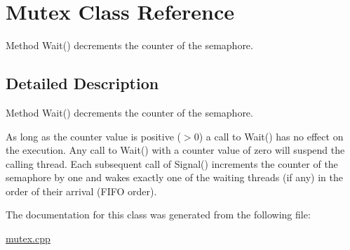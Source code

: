\hypertarget{class_mutex}{}\section{Mutex Class Reference}
\label{class_mutex}


Method Wait() decrements the counter of the semaphore.  




\subsection{Detailed Description}
Method Wait() decrements the counter of the semaphore. 

As long as the counter value is positive ($>$0) a call to Wait() has no effect on the execution. Any call to Wait() with a counter value of zero will suspend the calling thread. Each subsequent call of Signal() increments the counter of the semaphore by one and wakes exactly one of the waiting threads (if any) in the order of their arrival (F\+I\+FO order). 

The documentation for this class was generated from the following file\+:\begin{DoxyCompactItemize}
\item 
\mbox{\hyperlink{mutex_8cpp}{mutex.\+cpp}}\end{DoxyCompactItemize}
